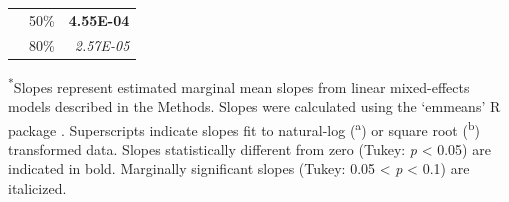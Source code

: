 \begin{landscape}
\begin{table}
\begin{tabular}{p{0.5cm}p{2cm}p{3cm}}
            & \multicolumn{1}{r}{50\%}
            &  \multicolumn{1}{r}{\textbf{4.55E-04}}
            \\
              
            & \multicolumn{1}{r}{80\%}
            &  \multicolumn{1}{r}{\textit{2.57E-05}} 
            \\
            \hline
        \end{tabular}%
        \label{tab:tablec.3}
    \end{table}
    \noindent \textsuperscript{*}Slopes represent estimated marginal mean slopes from linear mixed-effects models described in the Methods. Slopes were calculated using the ‘emmeans’ R package . Superscripts indicate slopes fit to natural-log (\textsuperscript{a}) or square root (\textsuperscript{b}) transformed data. Slopes statistically different from zero (Tukey: \textit{p} < 0.05) are indicated in bold. Marginally significant slopes (Tukey: 0.05 < \textit{p} < 0.1) are italicized.
\end{landscape}
\clearpage

